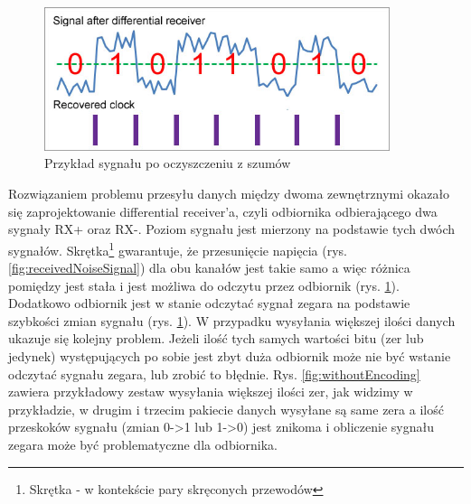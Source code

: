 \documentclass{BscUS}
\begin{document}
\begin{figure}[H]
\centering
\includegraphics[width=0.9\textwidth]{./img/receivedCleanedSignal}
\caption{Przykład sygnału po oczyszczeniu z szumów \cite{receivedCleanedSignal}}
\label{fig:receivedCleanedSignal}
\end{figure}
\noindent Rozwiązaniem problemu przesyłu danych między dwoma zewnętrznymi okazało się zaprojektowanie differential receiver'a, czyli odbiornika odbierającego dwa sygnały RX+ oraz RX-. Poziom sygnału jest mierzony na podstawie tych dwóch sygnałów. Skrętka\footnote{Skrętka - w kontekście pary skręconych przewodów} gwarantuje, że przesunięcie napięcia (rys. \ref{fig:receivedNoiseSignal}) dla obu kanałów jest takie samo a więc różnica pomiędzy jest stała i jest możliwa do odczytu przez odbiornik (rys. \ref{fig:receivedCleanedSignal}). Dodatkowo odbiornik jest w stanie odczytać sygnał zegara na podstawie szybkości zmian sygnału (rys. \ref{fig:receivedCleanedSignal}).
\newline
\indent W przypadku wysyłania większej ilości danych ukazuje się kolejny problem. Jeżeli ilość tych samych wartości bitu (zer lub jedynek) występujących po sobie jest zbyt duża odbiornik może nie być wstanie odczytać sygnału zegara, lub zrobić to błędnie. Rys. \ref{fig:withoutEncoding} zawiera przykładowy zestaw wysyłania większej ilości zer, jak widzimy w przykładzie, w drugim i trzecim pakiecie danych wysyłane są same zera a ilość przeskoków sygnału (zmian 0->1 lub 1->0) jest znikoma i obliczenie sygnału zegara może być problematyczne dla odbiornika.
\end{document}
